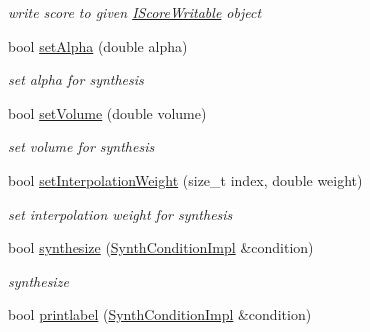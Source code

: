 \begin{DoxyCompactItemize}
\begin{DoxyCompactList}\small\item\em write score to given \hyperlink{classsinsy_1_1IScoreWritable}{\-I\-Score\-Writable} object \end{DoxyCompactList}\item 
\hypertarget{classsinsy_1_1SinsyImpl_a8c078864a93020ecde8e2ef7ef937bc8}{bool \hyperlink{classsinsy_1_1SinsyImpl_a8c078864a93020ecde8e2ef7ef937bc8}{set\-Alpha} (double alpha)}\label{classsinsy_1_1SinsyImpl_a8c078864a93020ecde8e2ef7ef937bc8}

\begin{DoxyCompactList}\small\item\em set alpha for synthesis \end{DoxyCompactList}\item 
\hypertarget{classsinsy_1_1SinsyImpl_ac5d68fb9e225a81ce7891ca55a325e37}{bool \hyperlink{classsinsy_1_1SinsyImpl_ac5d68fb9e225a81ce7891ca55a325e37}{set\-Volume} (double volume)}\label{classsinsy_1_1SinsyImpl_ac5d68fb9e225a81ce7891ca55a325e37}

\begin{DoxyCompactList}\small\item\em set volume for synthesis \end{DoxyCompactList}\item 
\hypertarget{classsinsy_1_1SinsyImpl_a1390773ced789ac13ec3711365456266}{bool \hyperlink{classsinsy_1_1SinsyImpl_a1390773ced789ac13ec3711365456266}{set\-Interpolation\-Weight} (size\-\_\-t index, double weight)}\label{classsinsy_1_1SinsyImpl_a1390773ced789ac13ec3711365456266}

\begin{DoxyCompactList}\small\item\em set interpolation weight for synthesis \end{DoxyCompactList}\item 
\hypertarget{classsinsy_1_1SinsyImpl_aaefd1b2092c4886a924540073e8794ba}{bool \hyperlink{classsinsy_1_1SinsyImpl_aaefd1b2092c4886a924540073e8794ba}{synthesize} (\hyperlink{classsinsy_1_1SynthConditionImpl}{\-Synth\-Condition\-Impl} \&condition)}\label{classsinsy_1_1SinsyImpl_aaefd1b2092c4886a924540073e8794ba}

\begin{DoxyCompactList}\small\item\em synthesize \end{DoxyCompactList}\item 
\hypertarget{classsinsy_1_1SinsyImpl_a8b26c8e6c77536ec158a353713523e1b}{bool \hyperlink{classsinsy_1_1SinsyImpl_a8b26c8e6c77536ec158a353713523e1b}{printlabel} (\hyperlink{classsinsy_1_1SynthConditionImpl}{\-Synth\-Condition\-Impl} \&condition)}\label{classsinsy_1_1SinsyImpl_a8b26c8e6c77536ec158a353713523e1b}


\end{DoxyCompactItemize}
